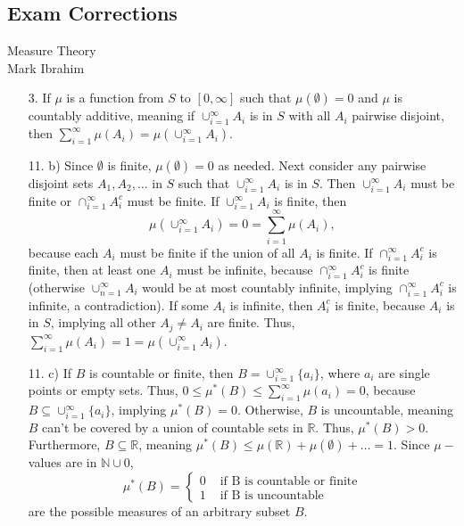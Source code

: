 \documentclass[a4paper, 12pt]{article}
\title{}
\date{}
\def\R{\ensuremath{\mathbb{R}}} %
\def\N{\ensuremath{\mathbb{N}}}
\begin{document}
\begin{center}
\section*{Exam Corrections}
Measure Theory\\
Mark Ibrahim \\
\end{center}

\begin{enumerate}
    \item[3.] 
    If $\mu$ is a function from $S$ to $[0, \infty]$ such that $\mu(\emptyset) = 0$ and 
    $\mu$ is countably additive, meaning 
     if  $\cup_{i=1}^\infty A_i$ is in $S$ with all $A_i$ pairwise disjoint, then 
     $\sum_{i=1}^\infty \mu(A_i) = \mu(\cup_{i=1}^\infty A_i)$.

    \item[ 11. b)] 
    Since $\emptyset$ is finite, $\mu(\emptyset) = 0$ as needed.
    Next consider any pairwise disjoint sets $A_1, A_2, \dots$ in $S$ such that 
    $\cup_{i=1}^\infty A_i$ is in $S$. 
    Then $\cup_{i=1}^\infty A_i$ must be finite or $\cap_{i=1}^\infty A_i^c$ must be finite.
    If $\cup_{i=1}^\infty A_i$ is finite, then 
    $$\mu(\cup_{i=1}^\infty A_i) = 0 = \sum_{i=1}^\infty \mu(A_i), $$
    because each $A_i$ must be finite if the union of all $A_i$ is finite.
    If $\cap_{i=1}^\infty A_i^c$ is finite, then at least one 
    $A_i$ must be infinite, because $\cap_{i=1}^\infty A_i^c$ is finite
    (otherwise $\cup_{n=1}^\infty A_i$ would be at most countably infinite,
    implying $\cap_{i=1}^\infty A_i^c$ is infinite, a contradiction).
    If some $A_i$ is infinite, then $A_i^c$ is finite, because $A_i$ is in 
    $S$, implying all other $A_j \neq A_i$ are finite. Thus, 
    $\sum_{i=1}^\infty \mu(A_i) = 1 = \mu(\cup_{i=1}^\infty A_i)$.

    \item[11. c)]
    If $B$ is countable or finite, then $B = \cup_{i=1}^\infty \{a_i\}$, where
    $a_i$ are single points or empty sets.
    Thus, $0 \leq \mu^*(B) \leq \sum_{i=1}^\infty \mu(a_i) = 0$, because
    $B \subseteq \cup_{i=1}^\infty \{a_i\}$, implying $\mu^*(B) = 0$.
    Otherwise, $B$ is uncountable, meaning $B$ can't be covered by a union of 
    countable sets in $\R$. Thus, $\mu^*(B) > 0$. 
    Furthermore, $B \subseteq \R$, meaning $\mu^*(B) \leq \mu(\R) + \mu(\emptyset) + \dots = 1$.    Since $\mu-$values are in $\N \cup 0$, 
        \begin{displaymath}
           \mu^*(B) = \left\{
             \begin{array}{ll}
               0 &  \text{ if B is countable or finite} \\
               1 &  \text{ if B is uncountable}
             \end{array}
           \right.
        \end{displaymath} 
        are the possible measures of an arbitrary subset $B$.


\end{enumerate}
\end{document}
